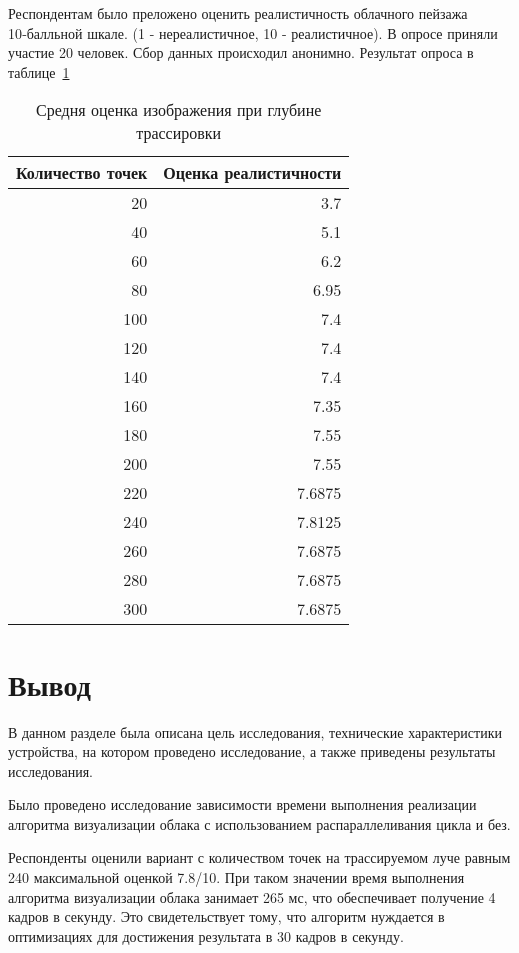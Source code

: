 Респондентам было преложено оценить реалистичность облачного пейзажа 10‑балльной шкале. (1 - нереалистичное, 10 - реалистичное). В опросе приняли участие 20 человек. Сбор данных происходил анонимно. Результат опроса в таблице~\ref{tab:rate}
\begin{table}[h!]
	\centering
	\caption{Средня оценка изображения при глубине трассировки}
	\begin{tabular}{|r|r|}
		\hline
		\textbf{Количество точек} & \textbf{Оценка реалистичности} \\
		\hline
		20 & 3.7 \\
		\hline
		40 & 5.1 \\
		\hline
		60 & 6.2 \\
		\hline
		80 & 6.95 \\
		\hline
		100 & 7.4 \\
		\hline
		120 & 7.4 \\
		\hline
		140 & 7.4 \\
		\hline
		160 & 7.35 \\
		\hline
		180 & 7.55 \\
		\hline
		200 & 7.55 \\
		\hline
		220 & 7.6875 \\
		\hline
		240 & 7.8125 \\
		\hline
		260 & 7.6875 \\
		\hline
		280 & 7.6875 \\
		\hline
		300 & 7.6875 \\
		\hline
	\end{tabular}
	\label{tab:rate}
\end{table}

\section*{Вывод}
В данном разделе была описана цель исследования, технические характеристики устройства, на котором проведено исследование, а также приведены результаты исследования.

Было проведено исследование зависимости времени выполнения реализации алгоритма визуализации облака с использованием распараллеливания цикла и без.

Респонденты оценили вариант с количеством точек на трассируемом луче равным 240 максимальной оценкой 7.8/10. При таком значении время выполнения алгоритма визуализации облака занимает 265 мс, что обеспечивает получение 4 кадров в секунду. Это свидетельствует тому, что алгоритм нуждается в оптимизациях для достижения результата в 30 кадров в секунду.